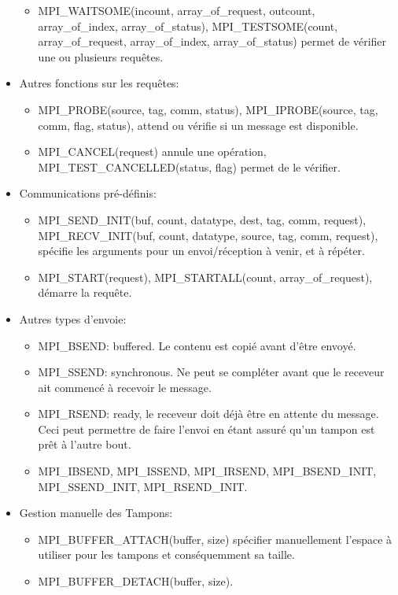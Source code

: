 \documentclass[oneside]{book}
\begin{document}
\begin{itemize}
\begin{itemize}
\item MPI\_WAITSOME(incount, array\_of\_request, outcount,
array\_of\_index, array\_of\_status), MPI\_TESTSOME(count,
array\_of\_request, array\_of\_index, array\_of\_status) permet de
vérifier une ou plusieurs requêtes.
\end{itemize}

\item Autres fonctions sur les requêtes:\\
\begin{itemize}
\item MPI\_PROBE(source, tag, comm, status),
MPI\_IPROBE(source, tag, comm, flag, status), attend ou
vérifie si un message est disponible.
\item MPI\_CANCEL(request) annule une opération,
MPI\_TEST\_CANCELLED(status, flag) permet de le
vérifier.
\end{itemize}

\item Communications pré-définis:\\
\begin{itemize}
\item MPI\_SEND\_INIT(buf, count, datatype, dest, tag, comm,
request), MPI\_RECV\_INIT(buf, count, datatype, source,
tag, comm, request), spécifie les arguments pour un
envoi/réception à venir, et à répéter.

\item MPI\_START(request), MPI\_STARTALL(count,
array\_of\_request), démarre la requête.
\end{itemize}
\item Autres types d'envoie:\\

\begin{itemize}
\item MPI\_BSEND: buffered. Le contenu est copié avant d'être
envoyé.

\item MPI\_SSEND: synchronous. Ne peut se compléter avant
que le receveur ait commencé à recevoir le message.

\item MPI\_RSEND: ready, le receveur doit déjà être en attente
du message. Ceci peut permettre de faire l'envoi en étant
assuré qu'un tampon est prêt à l'autre bout.
\item MPI\_IBSEND, MPI\_ISSEND, MPI\_IRSEND,
MPI\_BSEND\_INIT, MPI\_SSEND\_INIT, MPI\_RSEND\_INIT.
\end{itemize}
\item Gestion manuelle des Tampons:\\

\begin{itemize}
\item MPI\_BUFFER\_ATTACH(buffer, size) spécifier
manuellement l'espace à utiliser pour les tampons et
conséquemment sa taille.
\item MPI\_BUFFER\_DETACH(buffer, size).
\end{itemize}
\end{itemize}
\end{document}

